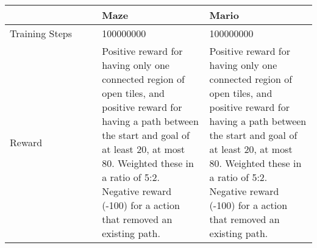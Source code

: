 \begin{tabular}{p{0.3\linewidth}|p{0.35\linewidth}|p{0.35\linewidth}}
\toprule
{} &                                                                                                                                                                                                                                                                   Maze &                                                                                                                                                                                                                                                                  Mario \\
\midrule
Training Steps &                                                                                                                                                                                                                                                              100000000 &                                                                                                                                                                                                                                                              100000000 \\
Reward         &  Positive reward for having only one connected region of open tiles, and positive reward for having a path between the start and goal of at least 20, at most 80. Weighted these in a ratio of 5:2. Negative reward (-100) for a action that removed an existing path. &  Positive reward for having only one connected region of open tiles, and positive reward for having a path between the start and goal of at least 20, at most 80. Weighted these in a ratio of 5:2. Negative reward (-100) for a action that removed an existing path. \\
\bottomrule
\end{tabular}
